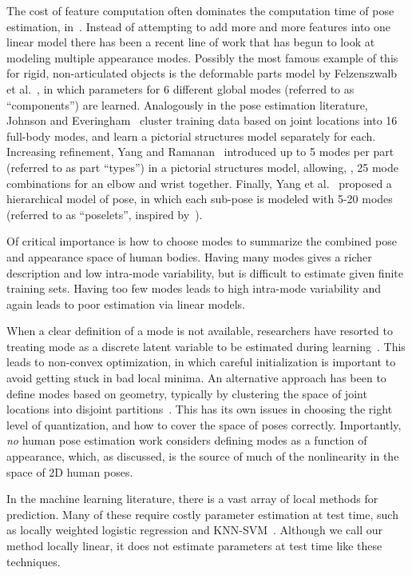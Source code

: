  The cost of feature computation often 
dominates the computation time of pose estimation, \eg 
in~\citep{devacrf,sapp2010}.  Instead of attempting to add more and more 
features into one linear model there has been a recent line of work that has 
begun to look at modeling multiple appearance modes.  Possibly the most famous 
example of this for rigid, non-articulated objects is the deformable parts 
model by Felzenszwalb et al.~\citep{dpm}, in which parameters for 6 different 
global modes (referred to as ``components'') are learned.  Analogously in the 
pose estimation literature, Johnson and Everingham~\citep{johnson11} cluster 
training data based on joint locations into 16 full-body modes, and learn a 
pictorial structures model separately for each.  Increasing refinement, Yang 
and Ramanan~\citep{deva2011} introduced up to 5 modes per part (referred to as 
part ``types'') in a pictorial structures model, allowing, \eg, 25 mode 
combinations for an elbow and wrist together.  Finally, Yang et 
al.~\citep{wang2011} proposed a hierarchical model of pose, in which each 
sub-pose is modeled with 5-20 modes (referred to as ``poselets'', inspired 
by~\citep{bourdev09}).

Of critical importance is how to choose modes to summarize the combined pose 
and appearance space of human bodies.  Having many modes gives a richer 
description and low intra-mode variability, but is difficult to estimate given 
finite training sets.  Having too few modes leads to high intra-mode 
variability and again leads to poor estimation via linear models. 

When a clear definition of a mode is not available, researchers have resorted 
to treating mode as a discrete latent variable to be estimated during 
learning~\citep{dpm,deva2011}.  This leads to non-convex optimization, in which 
careful initialization is important to avoid getting stuck in bad local minima.  
An alternative approach has been to define modes based on geometry, typically 
by clustering the space of joint locations into disjoint 
partitions~\citep{johnson11,wang2011}.  This has its own issues in choosing the 
right level of quantization, and how to cover the space of poses correctly.  
Importantly, {\em no} human pose estimation work considers defining modes as a 
function of appearance, which, as discussed, is the source of much of the 
nonlinearity in the space of 2D human poses. 

In the machine learning literature, there is a vast array of local methods for 
prediction.  Many of these require costly parameter estimation at test time, 
such as locally weighted logistic regression and KNN-SVM~\citep{zhang06}.  
Although we call our method locally linear, it does not estimate parameters at 
test time like these techniques.

